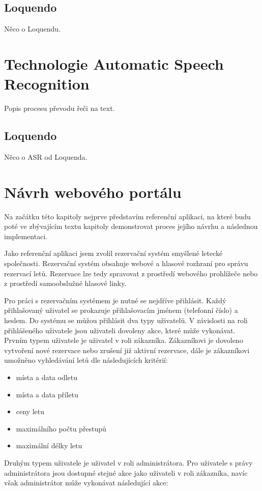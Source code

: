 \documentclass[ing,male,java,dept460]{diploma}						%
\begin{document}
\subsection{Loquendo}
Něco o Loquendu.

\section{Technologie Automatic Speech Recognition}
\label{sec:ASR}
Popis procesu převodu řeči na text.

\subsection{Loquendo}
Něco o ASR od Loquenda.

\section{Návrh webového portálu}
\label{sec:Navrh}
Na začátku této kapitoly nejprve představím referenční aplikaci, na které budu poté ve zbývajícím textu kapitoly demonstrovat proces jejího návrhu a následnou implementaci.

Jako referenční aplikaci jsem zvolil rezervační systém smyšlené letecké společnosti. Rezervační systém obsahuje webové a hlasové rozhraní pro správu rezervací letů. Rezervace lze tedy spravovat z prostředí webového prohlížeče nebo z prostředí samoobslužné hlasové linky.

Pro práci s rezervačním systémem je nutné se nejdříve přihlásit. Každý přihlašovaný uživatel se prokazuje přihlašovacím jménem (telefonní číslo) a heslem. Do systému se můžou přihlásit dva typy uživatelů. V závislosti na roli přihlášeného uživatele jsou uživateli dovoleny akce, které může vykonávat. Prvním typem uživatele je uživatel v roli zákazníka. Zákazníkovi je dovoleno vytvoření nové rezervace nebo zrušení již aktivní rezervace, dále je zákazníkovi umožněno vyhledávání letů dle následujících kritérií:

\begin{itemize}
\item místa a data odletu
\item místa a data příletu
\item ceny letu
\item maximálního počtu přestupů
\item maximální délky letu
\end{itemize}

Druhým typem uživatele je uživatel v roli administrátora. Pro uživatele s právy administrátora jsou dostupné stejné akce jako uživateli v roli zákazníka, navíc však administrátor může vykonávat následující akce:
\end{document}
